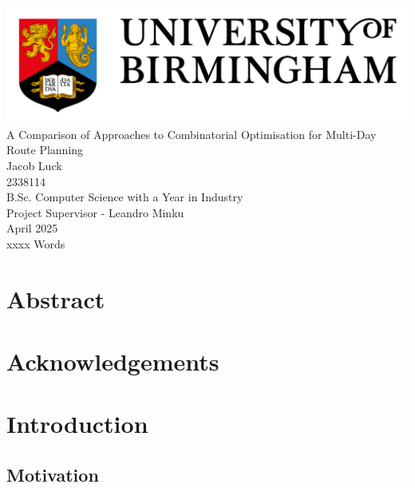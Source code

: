 \documentclass[a4paper,12pt]{article}
\begin{document}
    \begin{titlepage}
        \centering
        \vspace*{8ex}
        \includegraphics[width = 1\textwidth]{UoB_Logo}\\[10ex]
        \Huge{A Comparison of Approaches to Combinatorial Optimisation for Multi-Day Route Planning}\\[3ex]
        \LARGE{Jacob Luck}\\
        \large{2338114}\\[18ex]
        \Large{B.Sc. Computer Science with a Year in Industry}\\
        \Large{Project Supervisor - Leandro Minku}\\[6ex]
        \large{April 2025}\\
        \large{xxxx Words}
    \end{titlepage}

    \doublespacing

    \section*{Abstract}\label{sec:abstract}

    \pagebreak

    \section*{Acknowledgements}\label{sec:acknowledgements}

    \pagebreak

    \tableofcontents

    \pagebreak

    \section{Introduction}\label{sec:introduction}
    \subsection{Motivation}\label{subsec:motivation}
\end{document}
